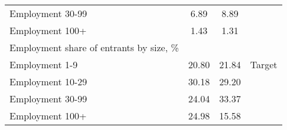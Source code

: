 \begin{tabular}{lccc}
\hspace{10mm}Employment 30-99 & 6.89 & 8.89 &  \\
\hspace{10mm}Employment 100+ & 1.43 & 1.31 &  \\
Employment share of entrants by size, \% &   &   &  \\
\hspace{10mm}Employment 1-9 & 20.80 & 21.84 & Target \\
\hspace{10mm}Employment 10-29 & 30.18 & 29.20 &  \\
\hspace{10mm}Employment 30-99 & 24.04 & 33.37 &  \\
\hspace{10mm}Employment 100+ & 24.98 & 15.58 &  \\
\bottomrule
\end{tabular}
